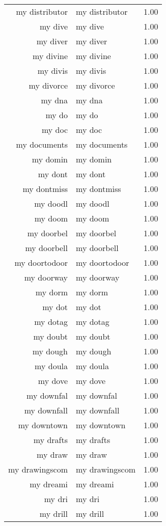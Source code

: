 \begin{table}[ht]
\begin{tabular}{rlr}
  my distributor & my distributor & 1.00 \\ 
  my dive & my dive & 1.00 \\ 
  my diver & my diver & 1.00 \\ 
  my divine & my divine & 1.00 \\ 
  my divis & my divis & 1.00 \\ 
  my divorce & my divorce & 1.00 \\ 
  my dna & my dna & 1.00 \\ 
  my do & my do & 1.00 \\ 
  my doc & my doc & 1.00 \\ 
  my documents & my documents & 1.00 \\ 
  my domin & my domin & 1.00 \\ 
  my dont & my dont & 1.00 \\ 
  my dontmiss & my dontmiss & 1.00 \\ 
  my doodl & my doodl & 1.00 \\ 
  my doom & my doom & 1.00 \\ 
  my doorbel & my doorbel & 1.00 \\ 
  my doorbell & my doorbell & 1.00 \\ 
  my doortodoor & my doortodoor & 1.00 \\ 
  my doorway & my doorway & 1.00 \\ 
  my dorm & my dorm & 1.00 \\ 
  my dot & my dot & 1.00 \\ 
  my dotag & my dotag & 1.00 \\ 
  my doubt & my doubt & 1.00 \\ 
  my dough & my dough & 1.00 \\ 
  my doula & my doula & 1.00 \\ 
  my dove & my dove & 1.00 \\ 
  my downfal & my downfal & 1.00 \\ 
  my downfall & my downfall & 1.00 \\ 
  my downtown & my downtown & 1.00 \\ 
  my drafts & my drafts & 1.00 \\ 
  my draw & my draw & 1.00 \\ 
  my drawingscom & my drawingscom & 1.00 \\ 
  my dreami & my dreami & 1.00 \\ 
  my dri & my dri & 1.00 \\ 
  my drill & my drill & 1.00 \\ 

\end{tabular}
\end{table}
